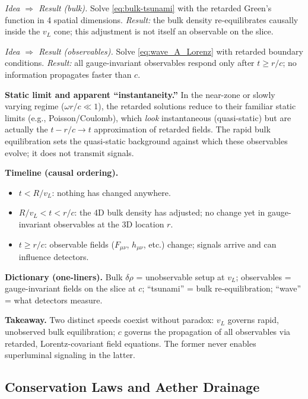 \medskip
\noindent\emph{Idea $\Rightarrow$ Result (bulk).} Solve \eqref{eq:bulk-tsunami} with the retarded Green's function in 4 spatial dimensions. \emph{Result:} the bulk density re-equilibrates causally inside the $v_L$ cone; this adjustment is not itself an observable on the slice.

\noindent\emph{Idea $\Rightarrow$ Result (observables).} Solve \eqref{eq:wave_A_Lorenz} with retarded boundary conditions. \emph{Result:} all gauge-invariant observables respond only after $t\ge r/c$; no information propagates faster than $c$.

\medskip
\noindent\textbf{Static limit and apparent ``instantaneity.''} In the near-zone or slowly varying regime ($\omega r/c\!\ll\!1$), the retarded solutions reduce to their familiar static limits (e.g., Poisson/Coulomb), which \emph{look} instantaneous (quasi-static) but are actually the $t{-}r/c\!\to\!t$ approximation of retarded fields. The rapid bulk equilibration sets the quasi-static background against which these observables evolve; it does not transmit signals.

\medskip
\noindent\textbf{Timeline (causal ordering).}
\begin{itemize}
\item $t< R/v_L$: nothing has changed anywhere.
\item $R/v_L < t < r/c$: the 4D bulk density has adjusted; no change yet in gauge-invariant observables at the 3D location $r$.
\item $t\ge r/c$: observable fields ($F_{\mu\nu}$, $h_{\mu\nu}$, etc.) change; signals arrive and can influence detectors.
\end{itemize}

\medskip
\noindent\textbf{Dictionary (one-liners).} Bulk $\delta\rho$ = unobservable setup at $v_L$; observables = gauge-invariant fields on the slice at $c$; ``tsunami'' = bulk re-equilibration; ``wave'' = what detectors measure.

\medskip
\noindent\textbf{Takeaway.} Two distinct speeds coexist without paradox: $v_L$ governs rapid, unobserved bulk equilibration; $c$ governs the propagation of all observables via retarded, Lorentz-covariant field equations. The former never enables superluminal signaling in the latter.

\subsection{Conservation Laws and Aether Drainage}

